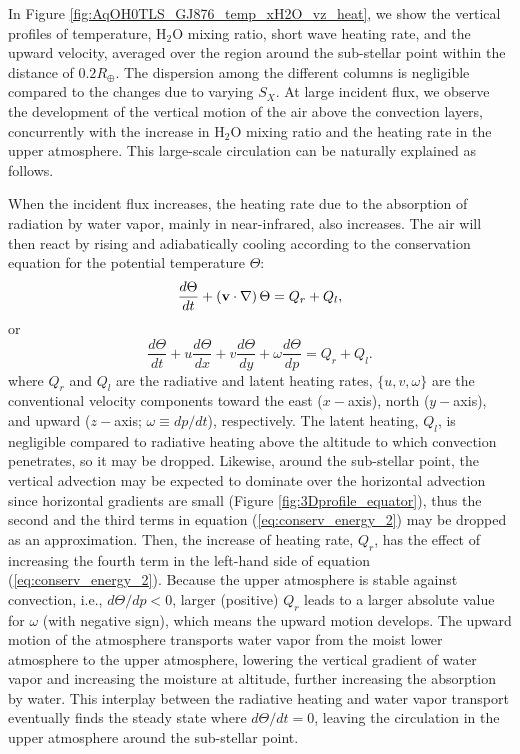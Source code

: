 \documentclass[11pt,numberedappendix,twocolappendix,]{emulateapj}
\def\water{H$_2$O }
\begin{document}
In Figure \ref{fig:AqOH0TLS_GJ876_temp_xH2O_vz_heat}, we show the vertical  profiles of temperature, \water mixing ratio, short wave heating rate, and the upward velocity, averaged over the region around the sub-stellar point within the distance of $0.2R_{\oplus }$. 
The dispersion among the different columns is negligible compared to the changes due to varying $S_X$. 
At large incident flux, we observe the development of the vertical motion of the air above the convection layers, concurrently with the increase in \water mixing ratio and the heating rate in the upper atmosphere. 
This large-scale circulation can be naturally explained as follows. 

When the incident flux increases, the heating rate due to the absorption of radiation by water vapor, mainly in near-infrared, also increases. 
The air will then react by rising and adiabatically cooling according to the conservation equation for the potential temperature $\Theta $:
\begin{equation}
\frac{d\Theta }{dt} + ( {\bf v} \cdot \nabla ) \, \Theta = Q_r + Q_l, \label{eq:conserv_energy}
\end{equation}
or
\begin{equation}
\frac{d\Theta }{dt} + u \frac{d\Theta }{dx} + v \frac{d\Theta }{dy} + \omega \frac{d\Theta }{dp} = Q_r + Q_l. \label{eq:conserv_energy_2}
\end{equation}
where $Q_r$ and $Q_l$ are the radiative and latent heating rates, $\{ u, v, \omega \}$ are the conventional velocity components toward the east ($x-$axis), north ($y-$axis), and upward ($z-$axis; $\omega \equiv  dp/dt$), respectively. 
The latent heating, $Q_l$, is negligible compared to radiative heating above the altitude to which convection penetrates, so it may be dropped. 
Likewise, around the sub-stellar point, the vertical advection may be expected to dominate over the horizontal advection since horizontal gradients are small (Figure \ref{fig:3Dprofile_equator}), thus the second and the third terms in equation (\ref{eq:conserv_energy_2}) may be dropped as an approximation. 
Then, the increase of heating rate, $Q_r$, has the effect of increasing the fourth term in the left-hand side of equation (\ref{eq:conserv_energy_2}). 
Because the upper atmosphere is stable against convection, i.e., $d \Theta / d p < 0 $, larger (positive) $Q_r$ leads to a larger absolute value for $\omega $ (with negative sign), which means the upward motion develops. 
The upward motion of the atmosphere transports water vapor from the moist lower atmosphere to the upper atmosphere, lowering the vertical gradient of water vapor and increasing the moisture at altitude, further increasing the absorption by water. 
This interplay between the radiative heating and water vapor transport eventually finds the steady state where $d\Theta/dt = 0$, leaving the  circulation in the upper atmosphere around the sub-stellar point. 
\end{document}
